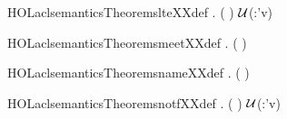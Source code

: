 \newcommand{\HOLaclsemanticsTheoremsltXXdef}{\UseVerbatim{HOLaclsemanticsTheoremsltXXdef}}
\begin{SaveVerbatim}{HOLaclsemanticsTheoremslteXXdef}
\HOLTokenTurnstile{} \HOLSymConst{\HOLTokenForall{}}    .
         (  ) \HOLSymConst{=}
       \HOLSymConst{\HOLTokenLeq{}}   \ensuremath{\cal{U}}(:'v)  \HOLTokenLeftbrace{}\HOLTokenRightbrace{}
\end{SaveVerbatim}
\newcommand{\HOLaclsemanticsTheoremslteXXdef}{\UseVerbatim{HOLaclsemanticsTheoremslteXXdef}}
\begin{SaveVerbatim}{HOLaclsemanticsTheoremsmeetXXdef}
\HOLTokenTurnstile{} \HOLSymConst{\HOLTokenForall{}}  .   (  ) \HOLSymConst{=}       
\end{SaveVerbatim}
\newcommand{\HOLaclsemanticsTheoremsmeetXXdef}{\UseVerbatim{HOLaclsemanticsTheoremsmeetXXdef}}
\begin{SaveVerbatim}{HOLaclsemanticsTheoremsnameXXdef}
\HOLTokenTurnstile{} \HOLSymConst{\HOLTokenForall{}} .   ( ) \HOLSymConst{=}  
\end{SaveVerbatim}
\newcommand{\HOLaclsemanticsTheoremsnameXXdef}{\UseVerbatim{HOLaclsemanticsTheoremsnameXXdef}}
\begin{SaveVerbatim}{HOLaclsemanticsTheoremsnotfXXdef}
\HOLTokenTurnstile{} \HOLSymConst{\HOLTokenForall{}}   .     ( ) \HOLSymConst{=} \ensuremath{\cal{U}}(:'v)      
\end{SaveVerbatim}
\newcommand{\HOLaclsemanticsTheoremsnotfXXdef}{\UseVerbatim{HOLaclsemanticsTheoremsnotfXXdef}}
